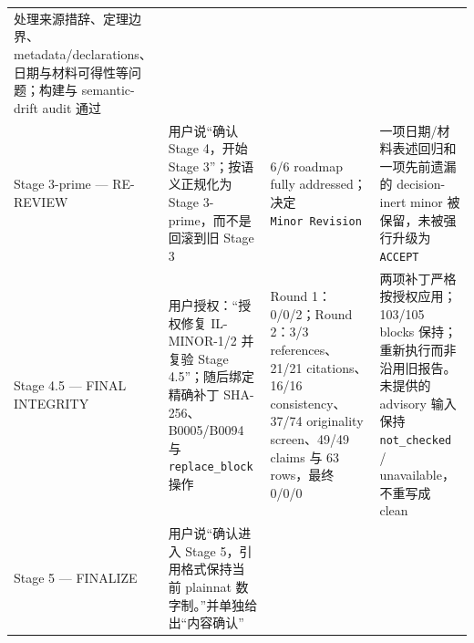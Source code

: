 \documentclass[12pt,a4paper]{article}
\begin{document}
\begin{longtable}[]{@{}llll@{}}
\begin{minipage}[t]{0.22\columnwidth}
处理来源措辞、定理边界、metadata/declarations、日期与材料可得性等问题；构建与
semantic-drift audit 通过\strut
\end{minipage}\tabularnewline
\begin{minipage}[t]{0.22\columnwidth}\raggedright
Stage 3-prime --- RE-REVIEW\strut
\end{minipage} & \begin{minipage}[t]{0.22\columnwidth}\raggedright
用户说``确认 Stage 4，开始 Stage 3''；按语义正规化为 Stage
3-prime，而不是回滚到旧 Stage 3\strut
\end{minipage} & \begin{minipage}[t]{0.22\columnwidth}\raggedright
6/6 roadmap fully addressed；决定 \texttt{Minor\ Revision}\strut
\end{minipage} & \begin{minipage}[t]{0.22\columnwidth}\raggedright
一项日期/材料表述回归和一项先前遗漏的 decision-inert minor
被保留，未被强行升级为 \texttt{ACCEPT}\strut
\end{minipage}\tabularnewline
\begin{minipage}[t]{0.22\columnwidth}\raggedright
Stage 4.5 --- FINAL INTEGRITY\strut
\end{minipage} & \begin{minipage}[t]{0.22\columnwidth}\raggedright
用户授权：``授权修复 IL-MINOR-1/2 并复验 Stage 4.5''；随后绑定精确补丁
SHA-256、B0005/B0094 与 \texttt{replace\_block} 操作\strut
\end{minipage} & \begin{minipage}[t]{0.22\columnwidth}\raggedright
Round 1：0/0/2；Round 2：3/3 references、21/21 citations、16/16
consistency、37/74 originality screen、49/49 claims 与 63 rows，最终
0/0/0\strut
\end{minipage} & \begin{minipage}[t]{0.22\columnwidth}\raggedright
两项补丁严格按授权应用；103/105 blocks
保持；重新执行而非沿用旧报告。未提供的 advisory 输入保持
\texttt{not\_checked} / unavailable，不重写成 clean\strut
\end{minipage}\tabularnewline
\begin{minipage}[t]{0.22\columnwidth}\raggedright
Stage 5 --- FINALIZE\strut
\end{minipage} & \begin{minipage}[t]{0.22\columnwidth}\raggedright
用户说``确认进入 Stage 5，引用格式保持当前 plainnat
数字制。''并单独给出``内容确认''\strut
\end{minipage} & \begin{minipage}[t]{0.22\columnwidth}\raggedright

\end{minipage}
\end{longtable}
\end{document}
